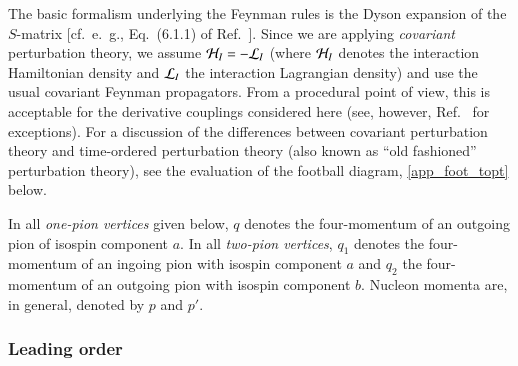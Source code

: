 \documentclass[sort&compress,preprint,3p]{elsarticle}
\begin{document}
The basic formalism underlying the Feynman rules is the Dyson expansion
of the $S$-matrix [cf.\ e.~g., Eq.~(6.1.1) of Ref.~\cite{Wei95}].
Since we are applying {\it covariant} perturbation theory, we
assume ${\cal H}_I = - {\cal L}_I$ (where ${\cal H}_I$ denotes the interaction
Hamiltonian density and ${\cal L}_I$ the interaction Lagrangian density)
and use the usual covariant Feynman propagators.
From a procedural point of view, this is acceptable for the derivative couplings considered here
(see, however, Ref.~\cite{Ger71} for exceptions). For a discussion of the differences
between covariant perturbation theory and time-ordered perturbation theory (also
known as ``old fashioned'' perturbation theory), see the evaluation of the
football diagram, \ref{app_foot_topt} below.

In all {\it one-pion vertices} given below,
$q$ denotes the four-momentum of an outgoing pion 
of isospin component $a$. 
In all {\it two-pion vertices},
$q_1$ denotes the four-momentum of an ingoing pion with
isospin component $a$ and
$q_2$ the four-momentum of an outgoing pion with isospin
component $b$.
Nucleon momenta are, in general, denoted by $p$ and $p'$. 


\subsubsection{Leading order}
\end{document}
